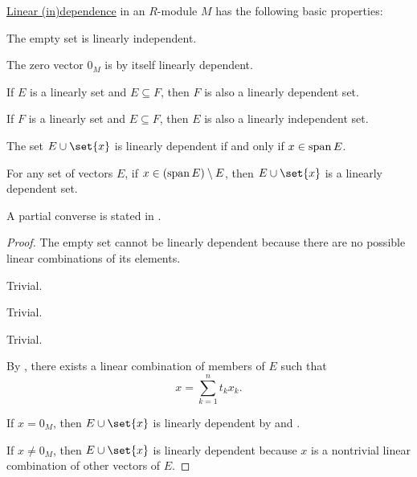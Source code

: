 \begin{proposition}\label{thm:def:linear_dependence}
  \hyperref[def:linear_dependence]{Linear (in)dependence} in an \( R \)-module \( M \) has the following basic properties:
  \begin{thmenum}
     The empty set is linearly independent.

     The zero vector \( 0_M \) is by itself linearly dependent.

     If \( E \) is a linearly  set and \( E \subseteq F \), then \( F \) is also a linearly dependent set.

     If \( F \) is a linearly  set and \( E \subseteq F \), then \( E \) is also a linearly independent set.

     The set \( E \cup \set{ x } \) is linearly dependent if and only if \( x \in \operatorname{span} E \).

     For any set of vectors \( E \), if \( x \in (\operatorname{span} E) \setminus E \), then \( E \cup \set{ x } \) is a linearly dependent set.

    A partial converse is stated in .
  \end{thmenum}
\end{proposition}
\begin{proof}
   The empty set cannot be linearly dependent because there are no possible linear combinations of its elements.

   Trivial.

   Trivial.

   Trivial.

   By , there exists a linear combination of members of \( E \) such that
  \begin{equation*}
    x = \sum_{k=1}^n t_k x_k.
  \end{equation*}

  If \( x = 0_M \), then \( E \cup \set{ x } \) is linearly dependent by  and .

  If \( x \neq 0_M \), then \( E \cup \set{ x } \) is linearly dependent because \( x \) is a nontrivial linear combination of other vectors of \( E \).
\end{proof}

